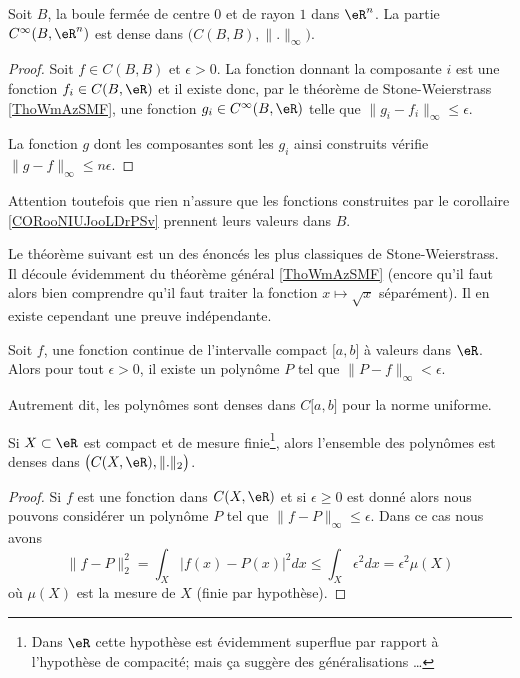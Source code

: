 \begin{corollary}        \label{CORooNIUJooLDrPSv}
    Soit \( B\), la boule fermée de centre \( 0\) et de rayon \( 1\) dans \( \eR^n\). La partie \( C^{\infty}(B,\eR^n)\) est dense dans \( \big( C(B,B),\| . \|_{\infty} \big)\).
\end{corollary}

\begin{proof}
    Soit \( f \in C(B,B)\) et \( \epsilon>0\). La fonction donnant la composante \( i\) est une fonction \( f_i\in C(B,\eR)\) et il existe donc, par le théorème de Stone-Weierstrass \ref{ThoWmAzSMF}, une fonction \( g_i\in  C^{\infty}(B,\eR)\) telle que \( \| g_i-f_i \|_{\infty}\leq \epsilon\).

    La fonction \( g\) dont les composantes sont les \( g_i\) ainsi construits vérifie \( \| g-f \|_{\infty}\leq n\epsilon\).
\end{proof}

Attention toutefois que rien n'assure que les fonctions construites par le corollaire \ref{CORooNIUJooLDrPSv} prennent leurs valeurs dans \( B\).

Le théorème suivant est un des énoncés les plus classiques de Stone-Weierstrass. Il découle évidemment du théorème général \ref{ThoWmAzSMF} (encore qu'il faut alors bien comprendre qu'il faut traiter la fonction \( x\mapsto \sqrt{x}\) séparément). Il en existe cependant une preuve indépendante.
\begin{theorem}     \label{ThoGddfas}   
    Soit \( f\), une fonction continue de l'intervalle compact \( \mathopen[ a , b \mathclose]\) à valeurs dans \( \eR\). Alors pour tout \( \epsilon>0\), il existe un polynôme \( P\) tel que \( \| P-f \|_{\infty}<\epsilon\).

    Autrement dit, les polynômes sont denses dans \( C\mathopen[ a , b \mathclose]\) pour la norme uniforme.
\end{theorem}

\begin{corollary}   \label{CorRSczQD}
    Si \( X\subset \eR\) est compact et de mesure finie\footnote{Dans \( \eR\) cette hypothèse est évidemment superflue par rapport à l'hypothèse de compacité; mais ça suggère des généralisations \ldots}, alors l'ensemble des polynômes est denses dans \( \big( C(X,\eR),\| . \|_2 \big)\).
\end{corollary}

\begin{proof}
    Si \( f\) est une fonction dans \( C(X,\eR)\) et si \( \epsilon\geq 0\) est donné alors nous pouvons considérer un polynôme \( P\) tel que \( \| f-P \|_{\infty}\leq \epsilon\). Dans ce cas nous avons
    \begin{equation}
        \| f-P \|_2^2=\int_X| f(x)-P(x) |^2dx\leq \int_X\epsilon^2dx=\epsilon^2\mu(X)
    \end{equation}
    où \( \mu(X)\) est la mesure de \( X\) (finie par hypothèse).
\end{proof}

